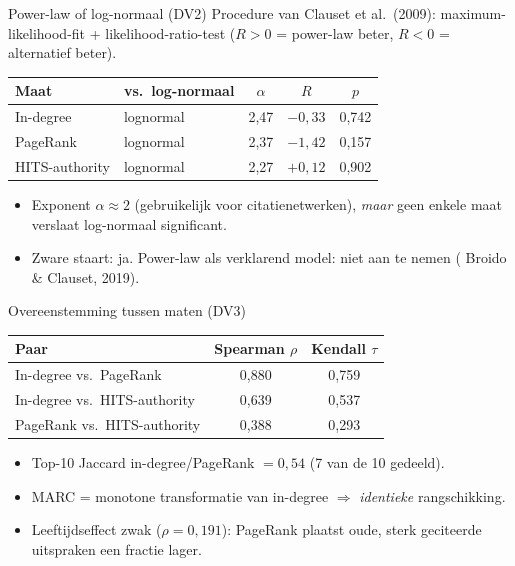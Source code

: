 \documentclass[aspectratio=169,11pt]{beamer}
\newcommand{\rd}[1]{\textcolor{uvared}{#1}}
\begin{document}
\begin{frame}{Power-law of log-normaal (DV2)}
  \footnotesize
  Procedure van Clauset et al.\ (2009): maximum-likelihood-fit + likelihood-ratio-test ($R>0$ = power-law beter, $R<0$ = alternatief beter).
  \begin{table}
    \centering\renewcommand{\arraystretch}{1.15}
    \begin{tabular}{@{}llccc@{}}
      \toprule
      Maat & vs.\ log-normaal & $\alpha$ & $R$ & $p$ \\
      \midrule
      In-degree & lognormal & 2,47 & $-0{,}33$ & 0,742 \\
      PageRank & lognormal & 2,37 & $-1{,}42$ & 0,157 \\
      HITS-authority & lognormal & 2,27 & $+0{,}12$ & 0,902 \\
      \bottomrule
    \end{tabular}
  \end{table}
  \begin{itemize}
    \item Exponent $\alpha\approx 2$ (gebruikelijk voor citatienetwerken), \emph{maar} geen enkele maat verslaat log-normaal significant.
    \item Zware staart: ja. Power-law als verklarend model: \rd{niet aan te nemen} ( Broido \& Clauset, 2019).
  \end{itemize}
\end{frame}

\begin{frame}{Overeenstemming tussen maten (DV3)}
  \footnotesize
  \begin{table}
    \centering\renewcommand{\arraystretch}{1.2}
    \begin{tabular}{@{}lcc@{}}
      \toprule
      Paar & Spearman $\rho$ & Kendall $\tau$ \\
      \midrule
      In-degree vs.\ PageRank & \rd{0,880} & 0,759 \\
      In-degree vs.\ HITS-authority & 0,639 & 0,537 \\
      PageRank vs.\ HITS-authority & 0,388 & 0,293 \\
      \bottomrule
    \end{tabular}
  \end{table}
  \begin{itemize}
    \item Top-10 Jaccard in-degree/PageRank $= 0{,}54$ (7 van de 10 gedeeld).
    \item MARC = monotone transformatie van in-degree $\Rightarrow$ \emph{identieke} rangschikking.
    \item Leeftijdseffect zwak ($\rho=0{,}191$): PageRank plaatst oude, sterk geciteerde uitspraken een fractie lager.
  \end{itemize}
\end{frame}
\end{document}
